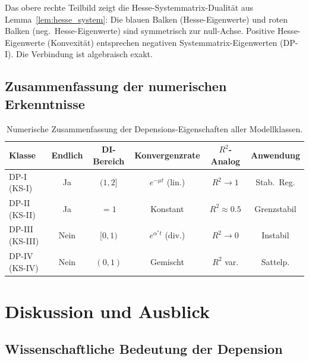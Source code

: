 ﻿\documentclass[12pt, a4paper]{article}
\theoremstyle{definition}
\theoremstyle{remark}
\begin{document}
Das obere rechte Teilbild zeigt die Hesse-Systemmatrix-Dualität aus
Lemma~\ref{lem:hesse_system}: Die blauen Balken (Hesse-Eigenwerte) und roten Balken
(neg.\ Hesse-Eigenwerte) sind symmetrisch zur null-Achse. Positive Hesse-Eigenwerte
(Konvexität) entsprechen negativen Systemmatrix-Eigenwerten (DP-I). Die Verbindung
ist algebraisch exakt.

\subsection{Zusammenfassung der numerischen Erkenntnisse}

\begin{table}[H]
  \centering
  \caption{Numerische Zusammenfassung der Depensions-Eigenschaften aller Modellklassen.}
  \label{tab:zusammenfassung}
  \renewcommand{\arraystretch}{1.4}
  \begin{tabular}{lccccc}
    \toprule
    Klasse & Endlich & DI-Bereich & Konvergenzrate & $R^2$-Analog & Anwendung \\
    \midrule
    DP-I (KS-I) & Ja & $(1, 2]$ & $e^{-\mu t}$ (lin.) & $R^2 \to 1$ & Stab.~Reg. \\
    DP-II (KS-II) & Ja & $= 1$ & Konstant & $R^2 \approx 0.5$ & Grenzstabil \\
    DP-III (KS-III) & Nein & $[0, 1)$ & $e^{\alpha^* t}$ (div.) & $R^2 \to 0$ & Instabil \\
    DP-IV (KS-IV) & Nein & $(0, 1)$ & Gemischt & $R^2$ var. & Sattelp. \\
    \bottomrule
  \end{tabular}
\end{table}

\section{Diskussion und Ausblick}
\label{sec:ausblick}

\subsection{Wissenschaftliche Bedeutung der Depension}
\end{document}
